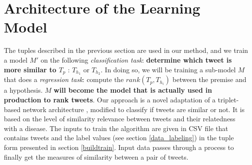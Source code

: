 \documentclass[12pt]{report}
\begin{document}
%
%
%
%
%

\section{Architecture of the Learning Model}\label{models}
The tuples described in the previous section are used in our method, and we train a model $M'$ on the following {\em classification task}: 
{\bf determine which tweet is more similar to $T_p$} : 
$T_{h_1}$ or $T_{h_2}$. In doing so, we will be training a sub-model $M$ that does a {\em regression task}: compute the $rank(T_p, T_{h_i})$ between the 
premise and a hypothesis. $M$ {\bf will become the model that is actually used in production to rank tweets}. 
Our approach  is a novel adaptation of a triplet-based network architecture \cite {Wang2014}, modified to classify if tweets are similar or not. It is based on the level of similarity relevance between tweets and their relatedness with a disease.  
The inputs to train the algorithm are given in \ac{CSV} file that contains tweets and the label values (see section \ref{data_labeling}) in the tuple form presented in section \ref{buildtrain}. Input data passes through a process to finally get the measures of similarity between a pair of tweets. 
\end{document}
